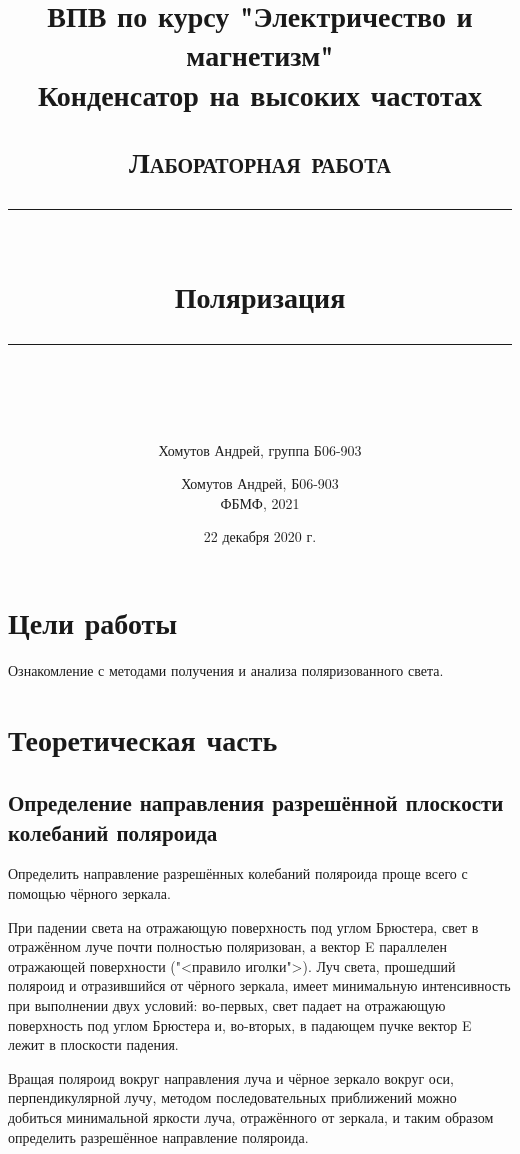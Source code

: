 \documentclass[a4paper, 12pt]{article}
\author{Хомутов Андрей, группа Б06-903}
\title{ВПВ по курсу "Электричество и магнетизм" \\ Конденсатор на высоких частотах}
\date{22 декабря 2020 г.}
\newcommand{\HRule}[1]{\rule{\linewidth}{#1}}
\begin{document}
\title{ \normalsize \textsc{Лабораторная работа}
		\\ [4.0cm]
		\HRule{0.5pt} \\ [0.3cm]
		\LARGE \textbf{{Поляризация}}
		\HRule{0.5pt} \\ [0.1cm]
		\normalsize  \vspace*{22\baselineskip}}

\date{}

\author{%
		Хомутов Андрей, Б06-903 \\
ФБМФ, 2021\\ }

\maketitle
\thispagestyle{empty}
\newpage
\section*{Цели работы} 
Ознакомление с методами получения и анализа поляризованного света.
 
\section{Теоретическая часть}
\subsection{Определение направления разрешённой плоскости колебаний поляроида}
	
Определить направление разрешённых колебаний поляроида проще всего с помощью чёрного зеркала.
	
При падении света на отражающую поверхность под углом Брюстера, свет в отражённом луче почти полностью поляризован, а вектор E
параллелен отражающей поверхности ("<правило иголки">). Луч света,
прошедший поляроид и отразившийся от чёрного зеркала, имеет минимальную интенсивность при выполнении двух условий: во-первых, свет
падает на отражающую поверхность под углом Брюстера и, во-вторых,
в падающем пучке вектор E лежит в плоскости падения.

Вращая поляроид вокруг направления луча и чёрное зеркало вокруг
оси, перпендикулярной лучу, методом последовательных приближений
можно добиться минимальной яркости луча, отражённого от зеркала,
и таким образом определить разрешённое направление поляроида.
\end{document}

